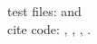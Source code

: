 \documentclass[11pt]{article}
\begin{document}
 test files:  \testC{} and \testV{}\\

 cite code: \plusUn{}, \pluslt{}, \position{}, \plusUntwice{}.
\end{document}
